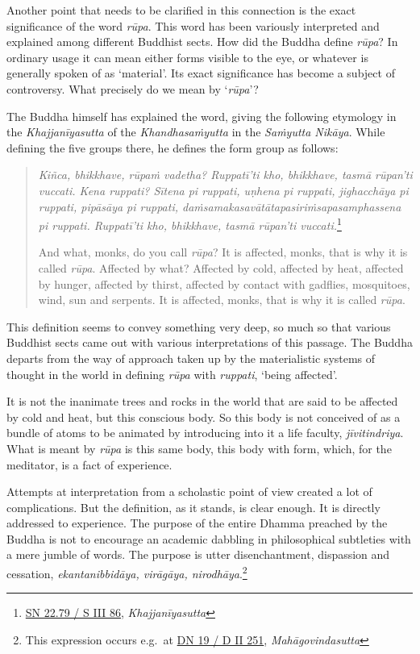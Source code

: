 Another point that needs to be clarified in this connection is the exact significance of the word \emph{rūpa}. This word has been variously interpreted and explained among different Buddhist sects. How did the Buddha define \emph{rūpa}? In ordinary usage it can mean either forms visible to the eye, or whatever is generally spoken of as `material'. Its exact significance has become a subject of controversy. What precisely do we mean by `\emph{rūpa}'?

The Buddha himself has explained the word, giving the following etymology in the \emph{Khajjanīyasutta} of the \emph{Khandhasaṁyutta} in the \emph{Saṁyutta Nikāya}. While defining the five groups there, he defines the form group as follows:

\begin{quote}
\emph{Kiñca, bhikkhave, rūpaṁ vadetha? Ruppatī'ti kho, bhikkhave, tasmā rūpan'ti vuccati. Kena ruppati? Sītena pi ruppati, uṇhena pi ruppati, jighacchāya pi ruppati, pipāsāya pi ruppati, daṁsamakasavātātapasiriṁsapasamphassena pi ruppati. Ruppatī'ti kho, bhikkhave, tasmā rūpan'ti vuccati.}\footnote{\href{https://suttacentral.net/sn22.79/pli/ms}{SN 22.79 / S III 86}, \emph{Khajjanīyasutta}}

And what, monks, do you call \emph{rūpa}? It is affected, monks, that is why it is called \emph{rūpa}. Affected by what? Affected by cold, affected by heat, affected by hunger, affected by thirst, affected by contact with gadflies, mosquitoes, wind, sun and serpents. It is affected, monks, that is why it is called \emph{rūpa}.
\end{quote}

This definition seems to convey something very deep, so much so that various Buddhist sects came out with various interpretations of this passage. The Buddha departs from the way of approach taken up by the materialistic systems of thought in the world in defining \emph{rūpa} with \emph{ruppati}, `being affected'.

It is not the inanimate trees and rocks in the world that are said to be affected by cold and heat, but this conscious body. So this body is not conceived of as a bundle of atoms to be animated by introducing into it a life faculty, \emph{jīvitindriya}. What is meant by \emph{rūpa} is this same body, this body with form, which, for the meditator, is a fact of experience.

Attempts at interpretation from a scholastic point of view created a lot of complications. But the definition, as it stands, is clear enough. It is directly addressed to experience. The purpose of the entire Dhamma preached by the Buddha is not to encourage an academic dabbling in philosophical subtleties with a mere jumble of words. The purpose is utter disenchantment, dispassion and cessation, \emph{ekantanibbidāya, virāgāya, nirodhāya}.\footnote{This expression occurs e.g.~at \href{https://suttacentral.net/dn19/pli/ms}{DN 19 / D II 251}, \emph{Mahāgovindasutta}}

